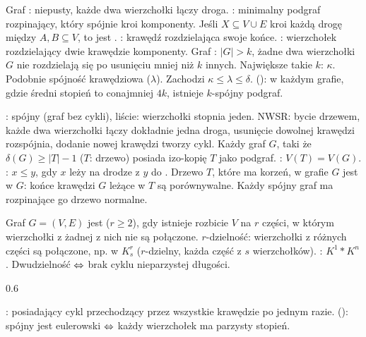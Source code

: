Graf :  niepusty, każde dwa wierzchołki łączy droga.
: minimalny podgraf rozpinający, który spójnie kroi komponenty.
Jeśli $X \subseteq V \cup E$ kroi każdą drogę między $A, B \subseteq V$, to jest .
: krawędź rozdzielająca swoje końce.
: wierzchołek rozdzielający dwie krawędzie komponenty.
Graf : $|G| > k$, żadne dwa wierzchołki $G$ nie rozdzielają się po usunięciu mniej niż $k$ innych.
Największe takie $k$:  $\kappa$.
Podobnie spójność krawędziowa ($\lambda$).
Zachodzi $\kappa \le \lambda \le \delta$.
 (): w każdym grafie, gdzie średni stopień to conajmniej $4k$, istnieje $k$-spójny podgraf.

:  spójny  (graf bez cykli), liście: wierzchołki stopnia jeden.
NWSR: bycie drzewem, każde dwa wierzchołki łączy dokładnie jedna droga, usunięcie dowolnej krawędzi rozspójnia, dodanie nowej krawędzi tworzy cykl.
Każdy graf $G$, taki że $\delta (G) \ge |T| - 1$ ($T$: drzewo) posiada izo-kopię $T$ jako podgraf.
: $V(T) = V(G)$.
: $x \le y$, gdy $x$ leży na drodze z $y$ do .
Drzewo $T$, które ma korzeń, w grafie $G$ jest  w $G$: końce krawędzi $G$ leżące w $T$ są porównywalne.
Każdy spójny graf ma rozpinające go drzewo normalne.

Graf $G = (V, E)$ jest  ($r \ge 2$), gdy istnieje rozbicie $V$ na $r$ części, w którym wierzchołki z żadnej z nich nie są połączone.
 $r$-dzielność: wierzchołki z różnych części są połączone, np. w $K_s^r$ ($r$-dzielny, każda część z $s$ wierzchołków).
: $K^1 * K^n$.
Dwudzielność $\Leftrightarrow$ brak cyklu nieparzystej długości.

0.6


: posiadający cykl przechodzący przez wszystkie krawędzie po jednym razie.
 (): spójny jest eulerowski $\Leftrightarrow$ każdy wierzchołek ma parzysty stopień.